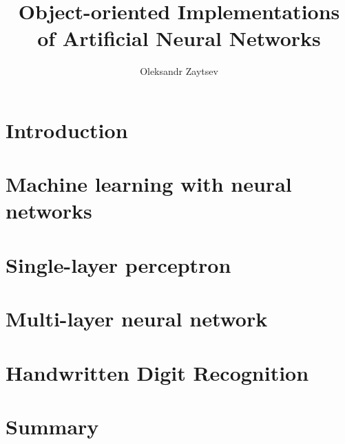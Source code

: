 \documentclass[a4paper, 12pt, oneside]{book}
\title{Object-oriented Implementations \\
       of Artificial Neural Networks}
\author{Oleksandr Zaytsev}
\begin{document}
  \maketitle
  \tableofcontents
  
  \chapter{Introduction}
  
  
  \chapter{Machine learning with neural networks}
  
  
  \chapter{Single-layer perceptron}
  
  
  \chapter{Multi-layer neural network}
  
  
  \chapter{Handwritten Digit Recognition}
  
  
  \chapter*{Summary}
  
  
%   
  
  
\end{document}
